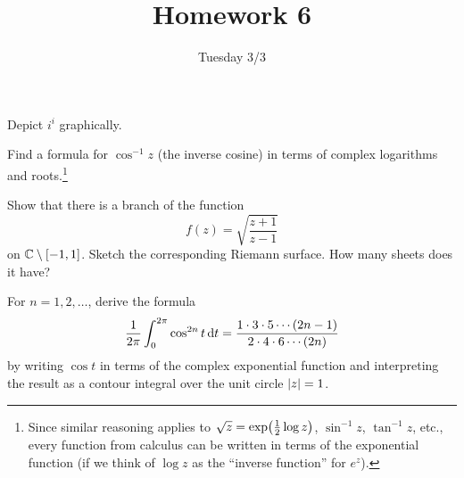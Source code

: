 \documentclass{../math135}
\title{Homework 6}
\author{}
\date{Tuesday 3/3}
\begin{document}
\begin{exercise}
	Depict \(i^i\) graphically.

  \begin{solution}
  \end{solution}

\end{exercise}

\begin{exercise}
	Find a formula for \(\cos^{-1} z\) (the inverse cosine) in terms of
  complex logarithms and roots.\footnote{Since similar reasoning
    applies to \(\sqrt z = \exp\prn*{\frac 1 2 \log z}\),
    \(\sin^{-1} z\), \(\tan^{-1} z\), etc., every function from
    calculus can be written in terms of the exponential function (if
    we think of \(\log z\) as the ``inverse function'' for \(e^z\)).}

  \begin{solution}
  \end{solution}

\end{exercise}

\begin{exercise}
	Show that there is a branch of the function
  \[
    f(z) = \sqrt{\frac{z+1}{z-1}}
  \]
  on \(\mathbb C \setminus [-1, 1]\).  Sketch the corresponding Riemann
  surface.  How many sheets does it have?

  \begin{solution}
  \end{solution}

\end{exercise}

\begin{exercise}
	For \(n = 1, 2, \ldots\), derive the formula
  \[
		\frac{1}{2\pi} \int_0^{2\pi} \cos^{2n} t \mathop{}\!\mathrm d t
    = \frac{1 \cdot 3 \cdot 5 \cdots (2n-1)}{2 \cdot 4 \cdot 6 \cdots (2n)}
  \]
	by writing \(\cos t\) in terms of the complex exponential function
  and interpreting the result as a contour integral over the unit
  circle \(\lvert z\rvert = 1\).

  \begin{solution}
  \end{solution}

\end{exercise}
\end{document}
